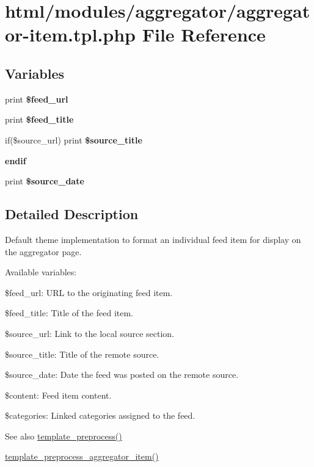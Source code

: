 \hypertarget{aggregator-item_8tpl_8php}{
\section{html/modules/aggregator/aggregator-\/item.tpl.php File Reference}
\label{aggregator-item_8tpl_8php}
}
\subsection*{Variables}
\begin{DoxyCompactItemize}
\item 
\hypertarget{aggregator-item_8tpl_8php_aa9dadc8b078c51d64c9c67fe879f12c7}{
print {\bfseries \$feed\_\-url}}
\label{aggregator-item_8tpl_8php_aa9dadc8b078c51d64c9c67fe879f12c7}

\item 
\hypertarget{aggregator-item_8tpl_8php_a6edb4dc2cf77c7c787f39d946791c26a}{
print {\bfseries \$feed\_\-title}}
\label{aggregator-item_8tpl_8php_a6edb4dc2cf77c7c787f39d946791c26a}

\item 
\hypertarget{aggregator-item_8tpl_8php_a79ea50acfbfb933606af65e170fa3975}{
if(\$source\_\-url) print {\bfseries \$source\_\-title}}
\label{aggregator-item_8tpl_8php_a79ea50acfbfb933606af65e170fa3975}

\item 
\hypertarget{aggregator-item_8tpl_8php_afb799dd9a092a5f9976f8b41dc0bcd98}{
{\bfseries endif}}
\label{aggregator-item_8tpl_8php_afb799dd9a092a5f9976f8b41dc0bcd98}

\item 
\hypertarget{aggregator-item_8tpl_8php_ac59d3a3ff66371f6b56743eb9cc361ca}{
print {\bfseries \$source\_\-date}}
\label{aggregator-item_8tpl_8php_ac59d3a3ff66371f6b56743eb9cc361ca}

\end{DoxyCompactItemize}


\subsection{Detailed Description}
Default theme implementation to format an individual feed item for display on the aggregator page.

Available variables:
\begin{DoxyItemize}
\item \$feed\_\-url: URL to the originating feed item.
\item \$feed\_\-title: Title of the feed item.
\item \$source\_\-url: Link to the local source section.
\item \$source\_\-title: Title of the remote source.
\item \$source\_\-date: Date the feed was posted on the remote source.
\item \$content: Feed item content.
\item \$categories: Linked categories assigned to the feed.
\end{DoxyItemize}

\begin{DoxySeeAlso}{See also}
\hyperlink{includes_2theme_8inc_a3eeb7bcdba7ef4859f99586da264d347}{template\_\-preprocess()} 

\hyperlink{aggregator_8pages_8inc_a98e977c5fd28c4e808be5786a3f9e805}{template\_\-preprocess\_\-aggregator\_\-item()} 
\end{DoxySeeAlso}

